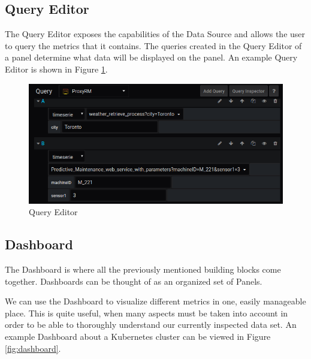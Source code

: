 \subsection{Query Editor}

The Query Editor exposes the capabilities of the Data Source and allows the user to query the metrics that it contains. The queries created in the Query Editor of a panel determine what data will be displayed on the panel. An example Query Editor is shown in Figure \ref{fig:query-editor}.

\begin{figure}[H]
	\centering
	\includegraphics[width=130mm, keepaspectratio]{figures/query-editor.png}
	\caption{Query Editor}
	\label{fig:query-editor}
\end{figure}

\subsection{Dashboard}
The Dashboard is where all the previously mentioned building blocks come together. Dashboards can be thought of as an organized set of Panels.

We can use the Dashboard to visualize different metrics in one, easily manageable place. This is quite useful, when many aspects must be taken into account in order to be able to thoroughly understand our currently inspected data set. An example Dashboard about a Kubernetes cluster can be viewed in Figure \ref{fig:dashboard}.


